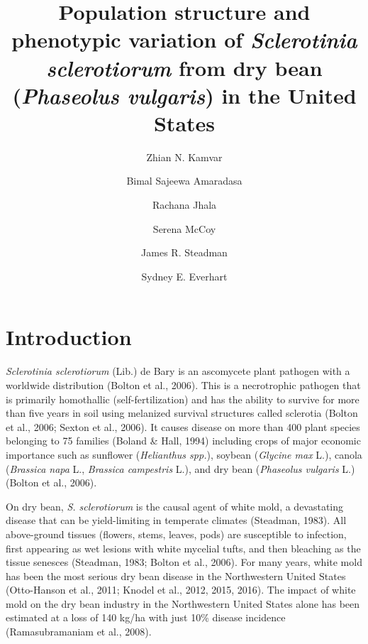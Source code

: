 \documentclass[fleqn,10pt,lineno]{wlpeerj} %
\title{Population structure and phenotypic variation of \emph{Sclerotinia
sclerotiorum} from dry bean (\emph{Phaseolus vulgaris}) in the United
States}
\author[1]{Zhian N. Kamvar}
\author[1]{Bimal Sajeewa Amaradasa}
\author[1]{Rachana Jhala}
\author[1]{Serena McCoy}
\author[1]{James R. Steadman}
\author[1]{Sydney E. Everhart}
\affil[1]{Department of Plant Pathology, University of Nebraska-Lincoln, Lincoln,
NE 68583}
\theoremstyle{definition}
\theoremstyle{definition}
\theoremstyle{definition}
\theoremstyle{remark}
\begin{document}
\flushbottom
\maketitle
\thispagestyle{empty}

\section*{Introduction}\label{introduction}

\emph{Sclerotinia sclerotiorum} (Lib.) de Bary is an ascomycete plant
pathogen with a worldwide distribution (Bolton et al., 2006). This is a
necrotrophic pathogen that is primarily homothallic (self-fertilization)
and has the ability to survive for more than five years in soil using
melanized survival structures called sclerotia (Bolton et al., 2006;
Sexton et al., 2006). It causes disease on more than 400 plant species
belonging to 75 families (Boland \& Hall, 1994) including crops of major
economic importance such as sunflower (\emph{Helianthus spp.}), soybean
(\emph{Glycine max} L.), canola (\emph{Brassica napa} L., \emph{Brassica
campestris} L.), and dry bean (\emph{Phaseolus vulgaris} L.) (Bolton et
al., 2006).

On dry bean, \emph{S. sclerotiorum} is the causal agent of white mold, a
devastating disease that can be yield-limiting in temperate climates
(Steadman, 1983). All above-ground tissues (flowers, stems, leaves,
pods) are susceptible to infection, first appearing as wet lesions with
white mycelial tufts, and then bleaching as the tissue senesces
(Steadman, 1983; Bolton et al., 2006). For many years, white mold has
been the most serious dry bean disease in the Northwestern United States
(Otto-Hanson et al., 2011; Knodel et al., 2012, 2015, 2016). The impact
of white mold on the dry bean industry in the Northwestern United States
alone has been estimated at a loss of 140 kg/ha with just 10\% disease
incidence (Ramasubramaniam et al., 2008).
\end{document}
